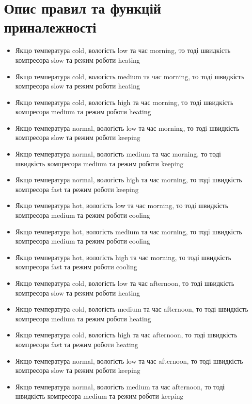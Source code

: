 \documentclass{article}
\begin{document}
    \section{Опис правил та функцій приналежності}
    \begin{itemize}
        \item Якщо температура cold, вологість low та час morning, то тоді швидкість компресора slow та режим роботи heating
        \item Якщо температура cold, вологість medium та час morning, то тоді швидкість компресора slow та режим роботи heating
        \item Якщо температура cold, вологість high та час morning, то тоді швидкість компресора medium та режим роботи heating
        \item Якщо температура normal, вологість low та час morning, то тоді швидкість компресора slow та режим роботи keeping
        \item Якщо температура normal, вологість medium та час morning, то тоді швидкість компресора medium та режим роботи keeping
        \item Якщо температура normal, вологість high та час morning, то тоді швидкість компресора fast та режим роботи keeping
        \item Якщо температура hot, вологість low та час morning, то тоді швидкість компресора medium та режим роботи cooling
        \item Якщо температура hot, вологість medium та час morning, то тоді швидкість компресора medium та режим роботи cooling
        \item Якщо температура hot, вологість high та час morning, то тоді швидкість компресора fast та режим роботи cooling
        \item Якщо температура cold, вологість low та час afternoon, то тоді швидкість компресора slow та режим роботи heating
        \item Якщо температура cold, вологість medium та час afternoon, то тоді швидкість компресора medium та режим роботи heating
        \item Якщо температура cold, вологість high та час afternoon, то тоді швидкість компресора fast та режим роботи heating
        \item Якщо температура normal, вологість low та час afternoon, то тоді швидкість компресора slow та режим роботи keeping
        \item Якщо температура normal, вологість medium та час afternoon, то тоді швидкість компресора medium та режим роботи keeping

\end{itemize}
\end{document}
